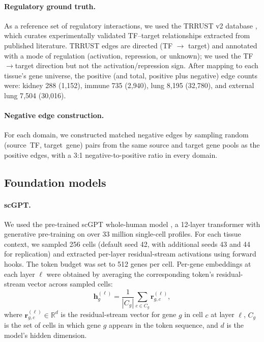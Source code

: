 \documentclass[11pt]{article}
\begin{document}
\paragraph{Regulatory ground truth.}
As a reference set of regulatory interactions, we used the TRRUST v2 database \cite{han2018trrust}, which curates experimentally validated TF--target relationships extracted from published literature.
TRRUST edges are directed (TF $\rightarrow$ target) and annotated with a mode of regulation (activation, repression, or unknown); we used the TF$\rightarrow$target direction but not the activation/repression sign.
After mapping to each tissue's gene universe, the positive (and total, positive plus negative) edge counts were: kidney 288 (1{,}152), immune 735 (2{,}940), lung 8{,}195 (32{,}780), and external lung 7{,}504 (30{,}016).

\paragraph{Negative edge construction.}
For each domain, we constructed matched negative edges by sampling random (source~TF, target~gene) pairs from the same source and target gene pools as the positive edges, with a 3:1 negative-to-positive ratio in every domain.

\subsection*{Foundation models}

\paragraph{scGPT.}
We used the pre-trained scGPT whole-human model \cite{cui2024scgpt}, a 12-layer transformer with generative pre-training on over 33 million single-cell profiles.
For each tissue context, we sampled 256 cells (default seed 42, with additional seeds 43 and 44 for replication) and extracted per-layer residual-stream activations using forward hooks.
The token budget was set to 512 genes per cell.
Per-gene embeddings at each layer $\ell$ were obtained by averaging the corresponding token's residual-stream vector across sampled cells:
\begin{equation}
    \mathbf{h}_g^{(\ell)} = \frac{1}{|C_g|} \sum_{c \in C_g} \mathbf{r}_{g,c}^{(\ell)},
    \label{eq:gene_embedding}
\end{equation}
where $\mathbf{r}_{g,c}^{(\ell)} \in \mathbb{R}^d$ is the residual-stream vector for gene $g$ in cell $c$ at layer $\ell$, $C_g$ is the set of cells in which gene $g$ appears in the token sequence, and $d$ is the model's hidden dimension.
\end{document}
